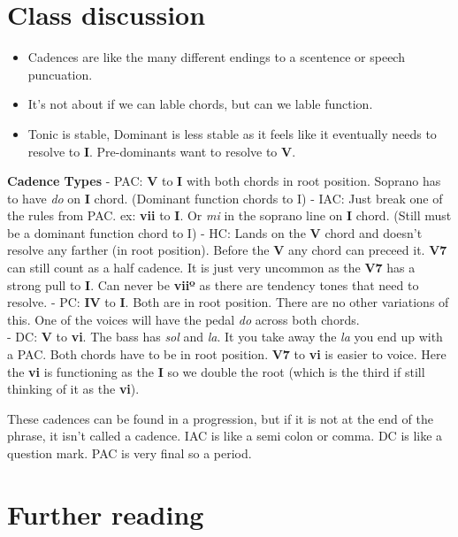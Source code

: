 \documentclass{book}
\providecommand{\tightlist}{%
  \setlength{\itemsep}{0pt}\setlength{\parskip}{0pt}}
\begin{document}
\hypertarget{class-discussion-1}{%
\chapter{Class discussion}\label{class-discussion-1}}

\begin{itemize}
\tightlist
\item
  Cadences are like the many different endings to a scentence or speech
  puncuation.
\item
  It's not about if we can lable chords, but can we lable function.
\item
  Tonic is stable, Dominant is less stable as it feels like it eventually
  needs to resolve to \textbf{I}. Pre-dominants want to resolve to \textbf{V}.
\end{itemize}

\textbf{Cadence Types} - PAC: \textbf{V} to \textbf{I} with both chords in
root position. Soprano has to have \emph{do} on \textbf{I} chord. (Dominant
function chords to I) - IAC: Just break one of the rules from PAC. ex:
\textbf{vii} to \textbf{I}. Or \emph{mi} in the soprano line on \textbf{I}
chord. (Still must be a dominant function chord to I) - HC: Lands on the
\textbf{V} chord and doesn't resolve any farther (in root position). Before
the \textbf{V} any chord can preceed it. \textbf{V7} can still count as a half
cadence. It is just very uncommon as the \textbf{V7} has a strong pull to
\textbf{I}. Can never be \textbf{viiº} as there are tendency tones that need
to resolve. - PC: \textbf{IV} to \textbf{I}. Both are in root position. There
are no other variations of this. One of the voices will have the pedal
\emph{do} across both chords.\\
- DC: \textbf{V} to \textbf{vi}. The bass has \emph{sol} and \emph{la}. It you
take away the \emph{la} you end up with a PAC. Both chords have to be in root
position. \textbf{V7} to \textbf{vi} is easier to voice. Here the \textbf{vi}
is functioning as the \textbf{I} so we double the root (which is the third if
still thinking of it as the \textbf{vi}).

These cadences can be found in a progression, but if it is not at the end of
the phrase, it isn't called a cadence. IAC is like a semi colon or comma. DC
is like a question mark. PAC is very final so a period.

\hypertarget{further-reading}{%
\chapter{Further reading}\label{further-reading}}
\end{document}
